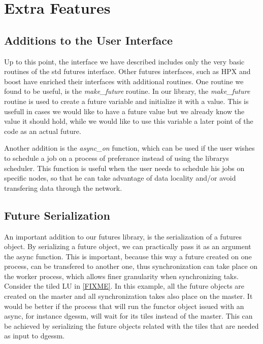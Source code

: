 \chapter{Extra Features}

\section{Additions to the User Interface}
Up to this point, the interface we have described includes only the very basic routines of the std futures interface.
Other futures interfaces, such as HPX and boost have enriched their interfaces with additional routines.  One routine
we found to be useful, is the \emph{make\_future} routine.  In our library, the \emph{make\_future} routine is used
to create a future variable and initialize it with a value.  This is usefull in cases we would like to have a future
value but we already know the value it should hold, while we would like to use this variable a later point of the code
as an actual future.


Another addition is the \emph{async\_on} function, which can be used if the user wishes to schedule a job on a process
of preferance instead of using the librarys scheduler.  This function is useful when the user needs to schedule his 
jobs on specific nodes, so that he can take advantage of data locality and/or avoid transfering data through the network.


\section{Future Serialization}
An important addition to our futures library, is the serialization of a futures object.  By serializing a future
object, we can practically pass it as an argument the async function.  This is important, because this way
a future created on one process, can be transfered to another one, thus synchronization can take place on the 
worker process, which allows finer granularity when synchronizing taks.  Consider the tiled LU in \ref{FIXME}.
In this example, all the future objects are created on the master and all synchronization takes also place on 
the master.  It would be better if the process that will run the functor object issued with an async, for instance
dgessm, will wait for its tiles instead of the master.  This can be achieved by serializing the future objects related
with the tiles that are needed as input to dgessm.



